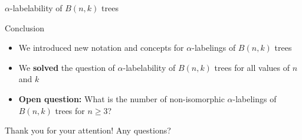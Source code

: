 \documentclass{beamer}
\begin{document}
\begin{frame}{$\alpha$-labelability of $B(n, k)$ trees}
\begin{figure}[H]
    \label{fig:labeling-graph}
  \end{figure}
\end{frame}

\begin{frame}{Conclusion}
  \begin{itemize}
    \item We introduced new notation and concepts for $\alpha$-labelings of $B(n, k)$ trees
    \item We \textbf{solved} the question of $\alpha$-labelability of $B(n, k)$ trees for all values of $n$ and $k$
    \item \textbf{Open question:} What is the number of non-isomorphic $\alpha$-labelings of $B(n, k)$ trees for $n \ge 3$?
  \end{itemize}
\end{frame}

\begin{frame}{Thank you for your attention!}
  \centering
  Any questions?
\end{frame}
\end{document}
